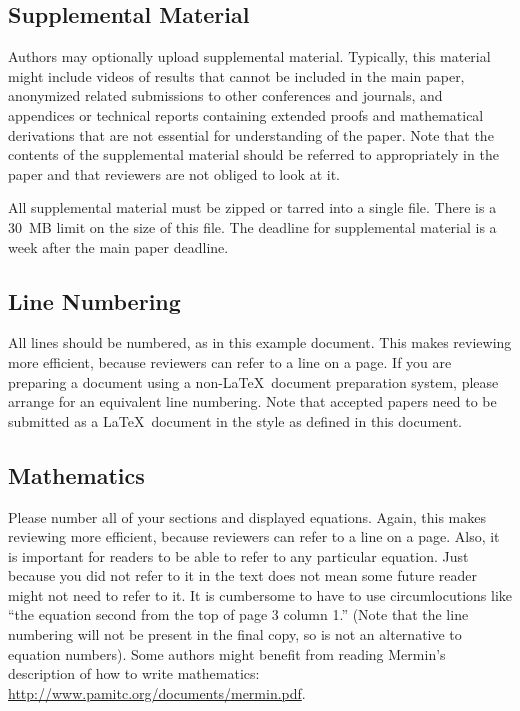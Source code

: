 \documentclass[runningheads]{llncs}
\begin{document}
\subsection{Supplemental Material} 

Authors may optionally upload supplemental material. Typically, this
material might include videos of results that cannot be included in
the main paper, anonymized related submissions to other conferences
and journals, and appendices or technical reports containing extended
proofs and mathematical derivations that are not essential for
understanding of the paper. Note that the contents of the supplemental
material should be referred to appropriately in the paper and that
reviewers are not obliged to look at it.

All supplemental material must be zipped or tarred into a single file. There is a 30~MB limit on the size of this file. The deadline for supplemental material is a week after the main paper deadline.

\subsection{Line Numbering}

All lines should be numbered, as in this example document. This makes
reviewing more efficient, because reviewers can refer to a line on a
page. If you are preparing a document using a non-\LaTeX\
document preparation system, please arrange for an equivalent line numbering. Note that accepted papers need to be submitted as a \LaTeX\
document in the style as defined in this document.

\subsection{Mathematics}

Please number all of your sections and displayed equations.  Again,
this makes reviewing more efficient, because reviewers can refer to a
line on a page.  Also, it is important for readers to be able to refer
to any particular equation.  Just because you did not refer to it in
the text does not mean some future reader might not need to refer to
it.  It is cumbersome to have to use circumlocutions like ``the
equation second from the top of page 3 column 1.''  (Note that the
line numbering will not be present in the final copy, so is not an
alternative to equation numbers).  Some authors might benefit from
reading Mermin's description of how to write mathematics:
\url{http://www.pamitc.org/documents/mermin.pdf}.
\end{document}
